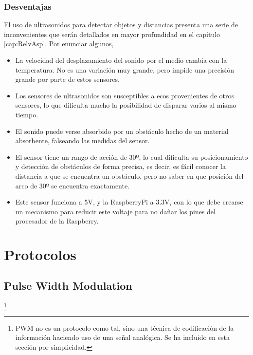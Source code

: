 \subsubsection{Desventajas}
El uso de ultrasonidos para detectar objetos y distancias presenta una serie de inconvenientes que serán detallados en mayor profundidad en el capítulo \ref{cap:RelvAsp}. Por enunciar algunos, 
\begin{itemize}
\item La velocidad del desplazamiento del sonido por el medio cambia con la temperatura. No es una variación muy grande, pero impide una precisión grande por parte de estos sensores.
\item Los sensores de ultrasonidos son susceptibles a ecos provenientes de otros sensores, lo que dificulta mucho la posibilidad de disparar varios al mismo tiempo.
\item El sonido puede verse absorbido por un obstáculo hecho de un material absorbente, falseando las medidas del sensor.
\item El sensor tiene un rango de acción de 30º, lo cual dificulta su posicionamiento y detección de obstáculos de forma precisa, es decir, es fácil conocer la distancia a que se encuentra un obstáculo, pero no saber en que posición del arco de 30º se encuentra exactamente.
\item Este sensor funciona a 5V, y la RaspberryPi a 3.3V, con lo que debe crearse un mecanismo para reducir este voltaje para no dañar los pines del procesador de la Raspberry.
\end{itemize}

\newpage





\section{Protocolos}

\subsection{Pulse Width Modulation}\footnote{PWM no es un protocolo como tal, sino una técnica de codificación de la información haciendo uso de una señal analógica. Se ha incluido en esta sección por simplicidad.}
\label{subsec:PWM}

